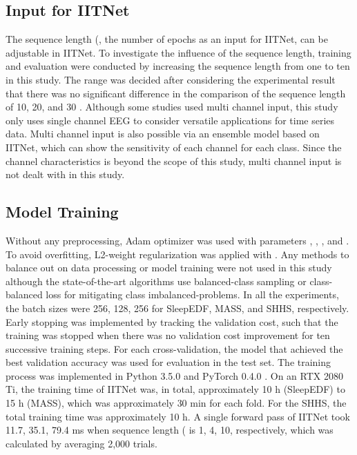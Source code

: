 \documentclass[10pt,twocolumn,twoside]{IEEEtran}
\begin{document}
    \subsection{Input for IITNet}
    The sequence length (, the number of epochs as an input for IITNet, can be adjustable in IITNet. 
    To investigate the influence of the sequence length, training and evaluation were conducted by increasing the sequence length from one to ten in this study. The range was decided after considering the experimental result that there was no significant difference in the comparison of the sequence length of 10, 20, and 30 \cite{phan2019seqsleepnet}. Although some studies used multi channel input, this study only uses single channel EEG to consider versatile applications for time series data. Multi channel input is also possible via an ensemble model based on IITNet, which can show the sensitivity of each channel for each class. Since the channel characteristics is beyond the scope of this study, multi channel input is not dealt with in this study.
    
    \subsection{Model Training}
    Without any preprocessing, Adam \cite{kingma2014adam} optimizer was used with parameters , , , and . To avoid overfitting, L2-weight regularization was applied with . Any methods to balance out on data processing or model training were not used in this study although the state-of-the-art algorithms use balanced-class sampling \cite{supratak2017deepsleepnet, tsinalis2016automatic} or class-balanced loss \cite{vilamala2017deep} for mitigating class imbalanced-problems. In all the experiments, the batch sizes were 256, 128, 256 for SleepEDF, MASS, and SHHS, respectively. Early stopping was implemented by tracking the validation cost, such that the training was stopped when there was no validation cost improvement for ten successive training steps. For each cross-validation, the model that achieved the best validation accuracy was used for evaluation in the test set. The training process was implemented in Python 3.5.0 and PyTorch 0.4.0 \cite{paszke2017automatic}. On an RTX 2080 Ti, the training time of IITNet was, in total, approximately 10 h (SleepEDF) to 15 h (MASS), which was approximately 30 min for each fold. For the SHHS, the total training time was approximately 10 h. A single forward pass of IITNet took 11.7, 35.1, 79.4 ms when sequence length ( is 1, 4, 10, respectively, which was calculated by averaging 2,000 trials.
\end{document}
